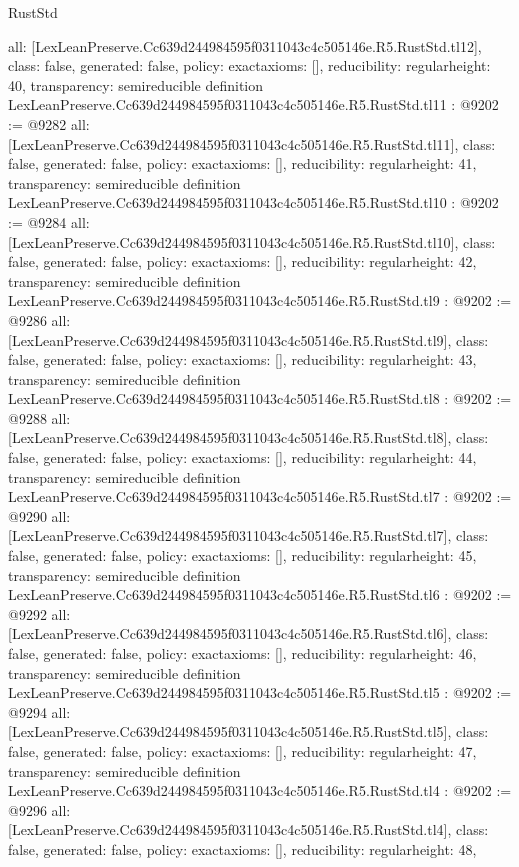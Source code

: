 \begin{lexlean}{RustStd}
\begin{coremodule}
{  all: [LexLeanPreserve.Cc639d244984595f0311043c4c505146e.R5.RustStd.tl12],
  class: false,
  generated: false,
  policy: exact{axioms: []},
  reducibility: regular{height: 40},
  transparency: semireducible
}
definition LexLeanPreserve.Cc639d244984595f0311043c4c505146e.R5.RustStd.tl11 : @9202 := @9282 {
  all: [LexLeanPreserve.Cc639d244984595f0311043c4c505146e.R5.RustStd.tl11],
  class: false,
  generated: false,
  policy: exact{axioms: []},
  reducibility: regular{height: 41},
  transparency: semireducible
}
definition LexLeanPreserve.Cc639d244984595f0311043c4c505146e.R5.RustStd.tl10 : @9202 := @9284 {
  all: [LexLeanPreserve.Cc639d244984595f0311043c4c505146e.R5.RustStd.tl10],
  class: false,
  generated: false,
  policy: exact{axioms: []},
  reducibility: regular{height: 42},
  transparency: semireducible
}
definition LexLeanPreserve.Cc639d244984595f0311043c4c505146e.R5.RustStd.tl9 : @9202 := @9286 {
  all: [LexLeanPreserve.Cc639d244984595f0311043c4c505146e.R5.RustStd.tl9],
  class: false,
  generated: false,
  policy: exact{axioms: []},
  reducibility: regular{height: 43},
  transparency: semireducible
}
definition LexLeanPreserve.Cc639d244984595f0311043c4c505146e.R5.RustStd.tl8 : @9202 := @9288 {
  all: [LexLeanPreserve.Cc639d244984595f0311043c4c505146e.R5.RustStd.tl8],
  class: false,
  generated: false,
  policy: exact{axioms: []},
  reducibility: regular{height: 44},
  transparency: semireducible
}
definition LexLeanPreserve.Cc639d244984595f0311043c4c505146e.R5.RustStd.tl7 : @9202 := @9290 {
  all: [LexLeanPreserve.Cc639d244984595f0311043c4c505146e.R5.RustStd.tl7],
  class: false,
  generated: false,
  policy: exact{axioms: []},
  reducibility: regular{height: 45},
  transparency: semireducible
}
definition LexLeanPreserve.Cc639d244984595f0311043c4c505146e.R5.RustStd.tl6 : @9202 := @9292 {
  all: [LexLeanPreserve.Cc639d244984595f0311043c4c505146e.R5.RustStd.tl6],
  class: false,
  generated: false,
  policy: exact{axioms: []},
  reducibility: regular{height: 46},
  transparency: semireducible
}
definition LexLeanPreserve.Cc639d244984595f0311043c4c505146e.R5.RustStd.tl5 : @9202 := @9294 {
  all: [LexLeanPreserve.Cc639d244984595f0311043c4c505146e.R5.RustStd.tl5],
  class: false,
  generated: false,
  policy: exact{axioms: []},
  reducibility: regular{height: 47},
  transparency: semireducible
}
definition LexLeanPreserve.Cc639d244984595f0311043c4c505146e.R5.RustStd.tl4 : @9202 := @9296 {
  all: [LexLeanPreserve.Cc639d244984595f0311043c4c505146e.R5.RustStd.tl4],
  class: false,
  generated: false,
  policy: exact{axioms: []},
  reducibility: regular{height: 48},
}
\end{coremodule}
\end{lexlean}
